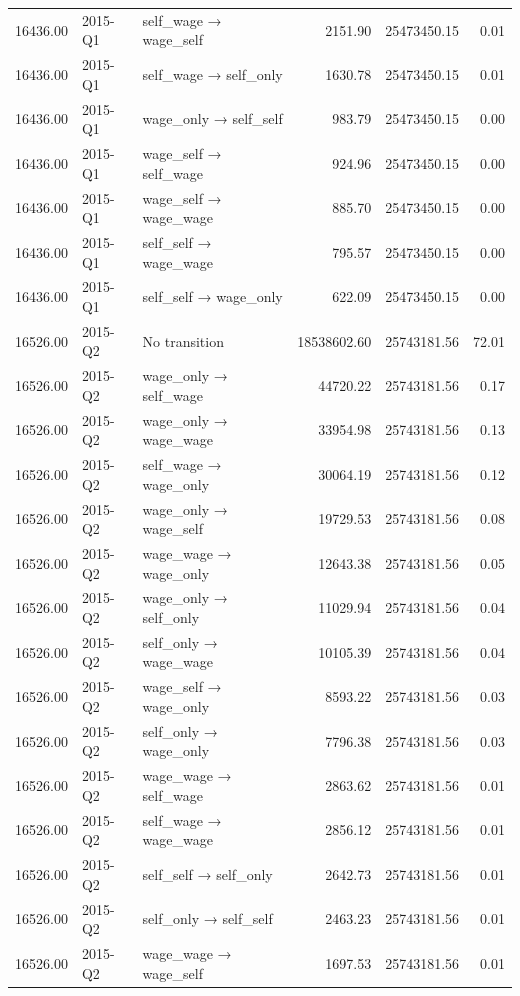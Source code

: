 \begin{table}[ht]
{\begin{tabular}{rllrrr}
  16436.00 & 2015-Q1 & self\_wage → wage\_self & 2151.90 & 25473450.15 & 0.01 \\ 
  16436.00 & 2015-Q1 & self\_wage → self\_only & 1630.78 & 25473450.15 & 0.01 \\ 
  16436.00 & 2015-Q1 & wage\_only → self\_self & 983.79 & 25473450.15 & 0.00 \\ 
  16436.00 & 2015-Q1 & wage\_self → self\_wage & 924.96 & 25473450.15 & 0.00 \\ 
  16436.00 & 2015-Q1 & wage\_self → wage\_wage & 885.70 & 25473450.15 & 0.00 \\ 
  16436.00 & 2015-Q1 & self\_self → wage\_wage & 795.57 & 25473450.15 & 0.00 \\ 
  16436.00 & 2015-Q1 & self\_self → wage\_only & 622.09 & 25473450.15 & 0.00 \\ 
  16526.00 & 2015-Q2 & No transition & 18538602.60 & 25743181.56 & 72.01 \\ 
  16526.00 & 2015-Q2 & wage\_only → self\_wage & 44720.22 & 25743181.56 & 0.17 \\ 
  16526.00 & 2015-Q2 & wage\_only → wage\_wage & 33954.98 & 25743181.56 & 0.13 \\ 
  16526.00 & 2015-Q2 & self\_wage → wage\_only & 30064.19 & 25743181.56 & 0.12 \\ 
  16526.00 & 2015-Q2 & wage\_only → wage\_self & 19729.53 & 25743181.56 & 0.08 \\ 
  16526.00 & 2015-Q2 & wage\_wage → wage\_only & 12643.38 & 25743181.56 & 0.05 \\ 
  16526.00 & 2015-Q2 & wage\_only → self\_only & 11029.94 & 25743181.56 & 0.04 \\ 
  16526.00 & 2015-Q2 & self\_only → wage\_wage & 10105.39 & 25743181.56 & 0.04 \\ 
  16526.00 & 2015-Q2 & wage\_self → wage\_only & 8593.22 & 25743181.56 & 0.03 \\ 
  16526.00 & 2015-Q2 & self\_only → wage\_only & 7796.38 & 25743181.56 & 0.03 \\ 
  16526.00 & 2015-Q2 & wage\_wage → self\_wage & 2863.62 & 25743181.56 & 0.01 \\ 
  16526.00 & 2015-Q2 & self\_wage → wage\_wage & 2856.12 & 25743181.56 & 0.01 \\ 
  16526.00 & 2015-Q2 & self\_self → self\_only & 2642.73 & 25743181.56 & 0.01 \\ 
  16526.00 & 2015-Q2 & self\_only → self\_self & 2463.23 & 25743181.56 & 0.01 \\ 
  16526.00 & 2015-Q2 & wage\_wage → wage\_self & 1697.53 & 25743181.56 & 0.01 \\ 

\end{tabular}}
\end{table}
